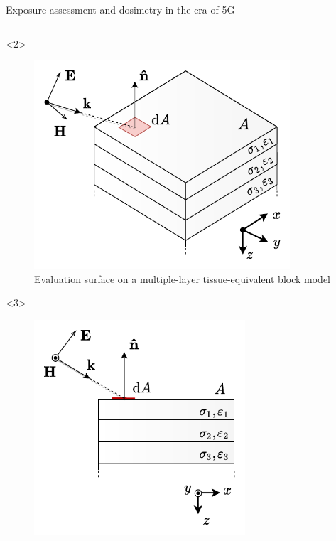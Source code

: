 \documentclass[xcolor=dvipsnames,10pt]{beamer}
\begin{document}
\begin{frame}{Exposure assessment and dosimetry in the era of 5G}
\begin{columns}[c]
\begin{column}{0.5\textwidth}
\begin{onlyenv}
            \end{onlyenv}
            \begin{onlyenv}<2>
                \begin{center}
                \begin{figure}
                    \includegraphics[width=0.85\textwidth]{artwork/averaging_surface.a.pdf}
                    \caption{Evaluation surface on a multiple-layer tissue-equivalent block model}
                \end{figure}
                \end{center}
            \end{onlyenv}
            \begin{onlyenv}<3>
                \begin{center}
                \begin{figure}
                    \includegraphics[width=0.7\textwidth]{artwork/averaging_surface.b.pdf}

\end{figure}
\end{center}
\end{onlyenv}
\end{column}
\end{columns}
\end{frame}
\end{document}
